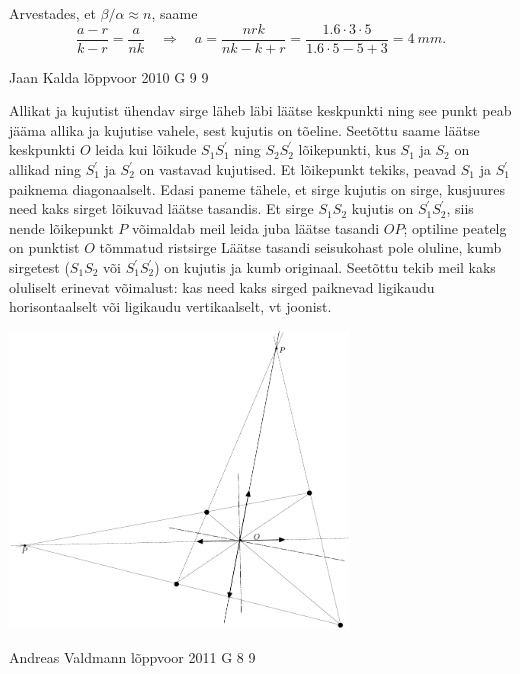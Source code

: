 \documentclass[11pt, twoside]{article}
\begin{document}
{{Arvestades, et $\beta /\alpha \approx n$, saame
\[
\frac{a-r}{k-r}=\frac{a}{n k} \quad \Rightarrow \quad a=\frac{n r k}{n k-k+r}=\frac{\num{1,6} \cdot \num{3} \cdot \num{5}}{\num{1,6} \cdot \num{5}-\num{5}+\num{3}}=\SI{4}{mm}.
\]
\fi
}

{Jaan Kalda} %
{lõppvoor} %
{2010} %
{G 9} %
{9} %
{

\ifSolution
Allikat ja kujutist ühendav sirge läheb läbi läätse keskpunkti ning see punkt peab jääma allika ja kujutise vahele, sest kujutis on tõeline.
Seetõttu saame läätse keskpunkti $O$ leida kui lõikude $S_1S_1^\prime$ ning $S_2S_2^\prime$ lõikepunkti, kus $S_1$ ja $S_2$ on allikad ning $S_1^\prime$ ja $S_2^\prime$
on vastavad kujutised. Et lõikepunkt tekiks, peavad $S_1$ ja $S_1^\prime$ paiknema diagonaalselt. Edasi paneme tähele, et sirge kujutis on sirge, kusjuures
need kaks sirget lõikuvad läätse tasandis. Et sirge $S_1S_2$ kujutis on $S_1^\prime S_2^\prime$, siis nende lõikepunkt $P$ võimaldab meil leida juba
läätse tasandi $OP$; optiline peatelg on punktist $O$ tõmmatud ristsirge Läätse tasandi seisukohast pole oluline, kumb sirgetest ($S_1S_2$ või $S_1^\prime S_2^\prime$) on kujutis ja kumb originaal.
Seetõttu tekib meil kaks oluliselt erinevat võimalust: kas need kaks sirged paiknevad ligikaudu horisontaalselt või ligikaudu vertikaalselt, vt joonist.\\

\begin{center}
	\includegraphics[width=90mm]{2010-v3g-09-punktid_lah}
\end{center}
\fi
}

{Andreas Valdmann} %
{lõppvoor} %
{2011} %
{G 8} %
{9} %
{

}}
\end{document}
